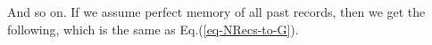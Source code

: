 \documentclass[12pt]{article}
\begin{document}
\beq
{}
\eeq
And so on. If  we assume
perfect memory of all
past records, then we get the following,
which is the same as 
Eq.(\ref{eq-NRecs-to-G}).

\beq
{}
\eeq



\end{document}
